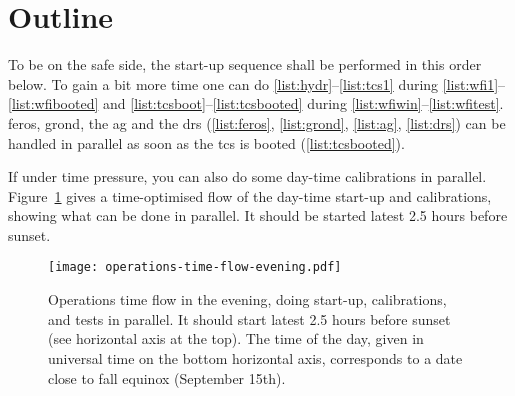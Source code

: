 \documentclass[11pt,fleqn]{book} %
\begin{document}
\section{Outline}

To be on the safe side, the start-up sequence shall be performed in this order below. To gain a bit more time one can do \ref{list:hydr}--\ref{list:tcs1} during \ref{list:wfi1}--\ref{list:wfibooted} and
\ref{list:tcsboot}--\ref{list:tcsbooted} during
\ref{list:wfiwin}--\ref{list:wfitest}.  \gls{feros}, \gls{grond}, the \gls{ag} and the \gls{drs} (\ref{list:feros}, \ref{list:grond}, \ref{list:ag}, \ref{list:drs}) can be handled in parallel as soon as the \gls{tcs} is booted
(\ref{list:tcsbooted}).  

If under time pressure, you can also do some day-time calibrations in parallel. Figure~\ref{fig:timeflow-eve} gives a time-optimised flow of the day-time start-up and calibrations, showing what can be done in parallel.  It should be started latest 2.5 hours before sunset.
\begin{figure}
\texttt{[image: operations-time-flow-evening.pdf]}
\caption{Operations time flow in the evening, doing start-up, calibrations, and tests in parallel.  It should start latest 2.5 hours before sunset (see horizontal axis at the top).  The time of the day, given in universal time on the bottom horizontal axis, corresponds to a date close to fall equinox (September 15th).}
\label{fig:timeflow-eve}
\end{figure}
\end{document}
